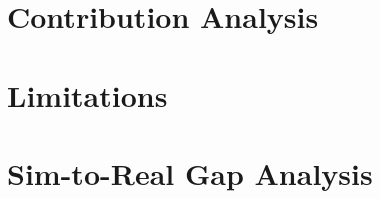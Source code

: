 \section{Contribution Analysis}
\label{sec:contrib-analysis}


\lipsum[43]

\begin{criticalinsight}
\end{criticalinsight}

\section{Limitations}
\label{sec:limitations}


\lipsum[44]

\begin{criticalinsight}
\end{criticalinsight}

\section{Sim-to-Real Gap Analysis}
\label{sec:sim-to-real}


\lipsum[45]

\begin{criticalinsight}
\end{criticalinsight}

